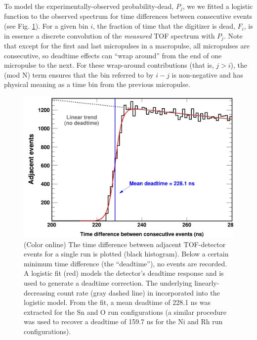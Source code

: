 \documentclass[twocolumn,secnumarabic,amssymb, nobibnotes, aps, prl,
superscriptaddress, nobalancelastpage]{revtex4}
\begin{document}
To model the experimentally-observed probability-dead, $P_{j}$, we
we fitted a logistic function to the observed spectrum for time
differences between consecutive events (see Fig.
\ref{TimeDifferenceBetweenEvents}). For a given bin $i$, the fraction of time that the 
digitizer is dead, $F_{i}$, is in essence a discrete convolution of the
\textit{measured} TOF spectrum with $P_{j}$. Note that except for the first and
last micropulses in a macropulse, all micropulses are consecutive, so deadtime effects can
``wrap around'' from the end of one micropulse to the next. For these wrap-around
contributions (that is, $j>i$), the (mod N) term ensures that the bin referred
to by $i-j$ is non-negative and has physical meaning as a time bin from the 
previous micropulse.
\begin{figure}
    \includegraphics[width=\linewidth]{figures/TimeDifferenceBetweenEvents.png}
    \caption{(Color online) The time difference between adjacent TOF-detector
    events for a single run is plotted (black histogram). Below a certain
minimum time difference (the ``deadtime''), no events are recorded. A logistic
fit (red) models the detector's deadtime response and is used to generate a
deadtime correction. The underlying linearly-decreasing count rate (gray dashed
line) in incorporated into the logistic model. From the fit, a mean deadtime of
228.1 ns was extracted for the Sn and O run configurations (a similar
procedure was used to recover a deadtime of 159.7 ns for the Ni and Rh
run configurations).}
    \label{TimeDifferenceBetweenEvents}
\end{figure}
\end{document}
